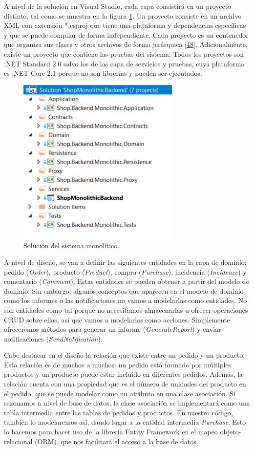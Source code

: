 \documentclass[11pt,spanish,listoffigures]{tfgetsinf}
\begin{document}
A nivel de la solución en Visual Studio, cada capa consistirá en un proyecto distinto, tal como se muestra en la figura \ref{fig:MonolithicSolution}. Un proyecto consiste en un archivo XML con extensión *.csproj que tiene una plataforma y dependencias específicas y que se puede compilar de forma independiente. Cada proyecto es un contenedor que organiza sus clases y otros archivos de forma jerárquica \hyperlink{page.80}{[48]}. Adicionalmente, existe un proyecto que contiene las pruebas del sistema. Todos los proyectos son .NET Standard 2.0 salvo los de las capa de servicios y pruebas, cuya plataforma es .NET Core 2.1 porque no son librerías y pueden ser ejecutados.

\begin{figure}[h]
\centering
\includegraphics[scale=0.8]{MonolithicSolution}
\caption{Solución del sistema monolítico.}
\label{fig:MonolithicSolution}
\end{figure}

A nivel de diseño, se van a definir las siguientes entidades en la capa de dominio: pedido (\textit{Order}), producto (\textit{Product}), compra (\textit{Purchase}), incidencia (\textit{Incidence}) y comentario (\textit{Comment}). Estas entidades se pueden obtener a partir del modelo de dominio. Sin embargo, algunos conceptos que aparecen en el modelo de dominio como los informes o las notificaciones no vamos a modelarlas como entidades. No son entidades como tal porque no necesitamos almacenarlas u ofrecer operaciones CRUD sobre ellas, así que vamos a modelarlas como acciones. Simplemente ofreceremos métodos para generar un informe (\textit{GenerateReport}) y enviar notificaciones (\textit{SendNotification}).

Cabe destacar en el diseño la relación que existe entre un pedido y un producto. Esta relación es de muchos a muchos: un pedido está formado por múltiples productos y un producto puede estar incluido en diferentes pedidos. Además, la relación cuenta con una propiedad que es el número de unidades del producto en el pedido, que se puede modelar como un atributo en una clase asociación. Si razonamos a nivel de base de datos, la clase asociación se implementará como una tabla intermedia entre las tablas de pedidos y productos. En nuestro código, también lo modelaremos así, dando lugar a la entidad intermedia \textit{Purchase}. Esto lo hacemos para hacer uso de la librería Entity Framework en el mapeo objeto-relacional (ORM), que nos facilitará el acceso a la base de datos.
\end{document}
